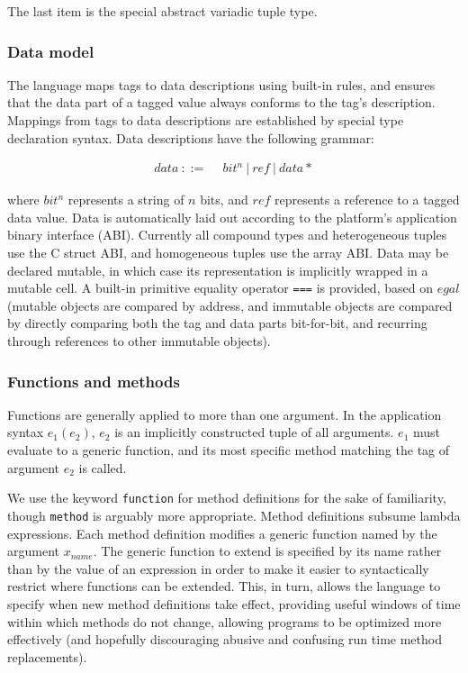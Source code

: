 \noindent
The last item is the special abstract variadic tuple type.

\subsubsection{Data model}

The language maps tags to data descriptions using built-in rules, and ensures that
the data part of a tagged value always conforms to the tag's description.
Mappings from tags to data descriptions are established by special type
declaration syntax.
Data descriptions have the following grammar:

\vspace{-3ex}
\begin{singlespace}
\begin{align*}
data\ ::=\ &\ bit^n\ |\ ref\ |\ data*
\end{align*}
\end{singlespace}

\noindent
where $bit^n$ represents a string of $n$ bits, and $ref$ represents a reference
to a tagged data value.
Data is automatically laid out according to the platform's application binary
interface (ABI).
Currently all compound types and heterogeneous tuples use the C struct ABI, and
homogeneous tuples use the array ABI.
Data may be declared mutable, in which case its representation is implicitly
wrapped in a mutable cell.
A built-in primitive equality operator \texttt{===} is provided, based on
$egal$ \cite{egal} (mutable objects are compared by address, and immutable objects
are compared by directly comparing both the tag and data parts bit-for-bit, and
recurring through references to other immutable objects).

\subsubsection{Functions and methods}

Functions are generally applied to more than one argument. In the application
syntax $e_1(e_2)$, $e_2$ is an implicitly constructed tuple of all arguments.
$e_1$ must evaluate to a generic function, and its most specific method
matching the tag of argument $e_2$ is called.

We use the keyword \texttt{function} for method definitions for the sake of
familiarity, though \texttt{method} is arguably more appropriate. Method
definitions subsume lambda expressions. Each method definition modifies a
generic function named by the argument $x_{name}$. The generic function to extend is
specified by its name rather than by the value of an expression in order to make it
easier to syntactically
restrict where functions can be extended. This, in turn, allows the language to
specify when new method definitions take effect, providing useful windows of
time within which methods do not change, allowing programs to be optimized more
effectively (and hopefully discouraging abusive and confusing run time
method replacements).

